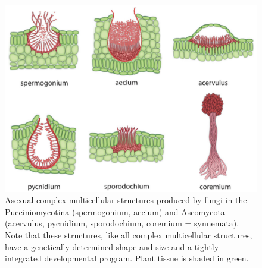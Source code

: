 \documentclass[10pt,dvipsnames,ignorenonframetext,aspectratio=169]{beamer}
\begin{document}
\begin{frame}{}
\begin{columns}[T, onlytextwidth]

\begin{figure}
\includegraphics[width=0.85\linewidth]{../images/asexual_multicellular_structures_fungi} \caption{Asexual complex multicellular structures produced by fungi in the Pucciniomycotina (spermogonium, aecium) and Ascomycota (acervulus, pycnidium, sporodochium, coremium = synnemata). Note that these structures, like all complex multicellular structures, have a genetically determined shape and size and a tightly integrated developmental program. Plant tissue is shaded in green.}\label{fig:asexual-structures-fungi}
\end{figure}

\end{columns}
\end{frame}
\end{document}

